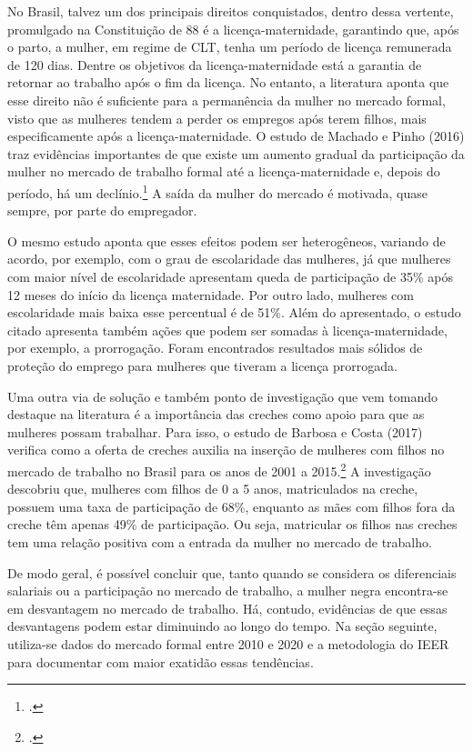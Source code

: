 \documentclass[12pt]{article}
\begin{document}
\par No Brasil, talvez um dos principais direitos conquistados, dentro dessa vertente, promulgado na Constituição de 88 é a licença-maternidade, garantindo que, após o parto, a mulher, em regime de CLT, tenha um período de licença remunerada de 120 dias. Dentre os objetivos da licença-maternidade está a garantia de retornar ao trabalho após o fim da licença. No entanto, a literatura aponta que esse direito não é suficiente para a permanência da mulher no mercado formal, visto que as mulheres tendem a perder os empregos após terem filhos, mais especificamente após a licença-maternidade. O estudo de Machado e Pinho (2016) traz evidências importantes de que existe um aumento gradual da participação da mulher no mercado de trabalho formal até a licença-maternidade e, depois do período, há um declínio.\footcite[]{machadoandpinho2016} A saída da mulher do mercado é motivada, quase sempre, por parte do empregador. 

\par O mesmo estudo aponta que esses efeitos podem ser heterogêneos, variando de acordo, por exemplo, com o grau de escolaridade das mulheres, já que mulheres com maior nível de escolaridade apresentam queda de participação de 35\% após 12 meses do início da licença maternidade. Por outro lado, mulheres com escolaridade mais baixa esse percentual é de 51\%. Além do apresentado, o estudo citado apresenta também ações que podem ser somadas à licença-maternidade, por exemplo, a prorrogação. Foram encontrados resultados mais sólidos de proteção do emprego para mulheres que tiveram a licença prorrogada.

\par Uma outra via de solução e também ponto de investigação que vem tomando destaque na literatura é a importância das creches como apoio para que as mulheres possam trabalhar. Para isso, o estudo de  Barbosa e Costa (2017) verifica como a oferta de creches auxilia na inserção de mulheres com filhos no mercado de trabalho no Brasil para os anos de 2001 a 2015.\footcite{barbosacosta2017} A investigação descobriu que, mulheres com filhos de 0 a 5 anos, matriculados na creche, possuem uma taxa de participação de 68\%, enquanto as mães com filhos fora da creche têm apenas 49\% de participação. Ou seja, matricular os filhos nas creches tem uma relação positiva com a entrada da mulher no mercado de trabalho.

\par De modo geral, é possível concluir que, tanto quando se considera os diferenciais salariais ou a participação no mercado de trabalho, a mulher negra encontra-se em desvantagem no mercado de trabalho. Há, contudo, evidências de que essas desvantagens podem estar diminuindo ao longo do tempo. Na seção seguinte, utiliza-se dados do mercado formal entre 2010 e 2020 e a metodologia do IEER para documentar com maior exatidão essas tendências.
\end{document}
